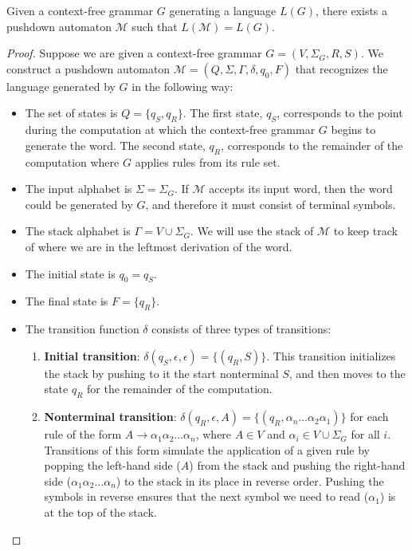 \begin{lemma}\label{lem:CFGtoPDA}
Given a context-free grammar $G$ generating a language $L(G)$, there exists a pushdown automaton $\mathcal{M}$ such that $L(\mathcal{M}) = L(G)$.

\begin{proof}
Suppose we are given a context-free grammar $G = (V, \Sigma_{G}, R, S)$. We construct a pushdown automaton $\mathcal{M} = (Q, \Sigma, \Gamma, \delta, q_{0}, F)$ that recognizes the language generated by $G$ in the following way:
\begin{itemize}
\item The set of states is $Q = \{q_{S}, q_{R}\}$. The first state, $q_{S}$, corresponds to the point during the computation at which the context-free grammar $G$ begins to generate the word. The second state, $q_{R}$, corresponds to the remainder of the computation where $G$ applies rules from its rule set.
\item The input alphabet is $\Sigma = \Sigma_{G}$. If $\mathcal{M}$ accepts its input word, then the word could be generated by $G$, and therefore it must consist of terminal symbols.
\item The stack alphabet is $\Gamma = V \cup \Sigma_{G}$. We will use the stack of $\mathcal{M}$ to keep track of where we are in the leftmost derivation of the word.
\item The initial state is $q_{0} = q_{S}$.
\item The final state is $F = \{q_{R}\}$.
\item The transition function $\delta$ consists of three types of transitions:
	\begin{enumerate}
	\item \textbf{Initial transition}: $\delta(q_{S}, \epsilon, \epsilon) = \{(q_{R}, S)\}$. This transition initializes the stack by pushing to it the start nonterminal $S$, and then moves to the state $q_{R}$ for the remainder of the computation.
	
	\item \textbf{Nonterminal transition}: $\delta(q_{R}, \epsilon, A) = \{(q_{R}, \alpha_{n}\dots\alpha_{2}\alpha_{1})\}$ for each rule of the form $A \rightarrow \alpha_{1}\alpha_{2}\dots\alpha_{n}$, where $A \in V$ and $\alpha_{i} \in V \cup \Sigma_{G}$ for all $i$. Transitions of this form simulate the application of a given rule by popping the left-hand side ($A$) from the stack and pushing the right-hand side ($\alpha_{1}\alpha_{2}\dots\alpha_{n}$) to the stack in its place in reverse order. Pushing the symbols in reverse ensures that the next symbol we need to read ($\alpha_{1}$) is at the top of the stack.
	

\end{enumerate}
\end{itemize}
\end{proof}
\end{lemma}
